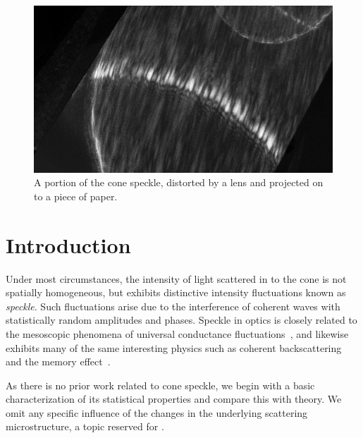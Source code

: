\begin{figure}[ht]
\centering
\includegraphics[keepaspectratio,width=15cm]{speckle/figures/Ag_LaSFN9_cone_lens11_cam-8899.jpg}
\caption{A portion of the cone speckle, distorted by a lens and projected on to a piece of paper.}
\label{fig:examplespeckle}
\end{figure}
\section{Introduction}
Under most circumstances, the intensity of light scattered in to the cone
is not spatially homogeneous, but exhibits distinctive intensity
fluctuations known as \textit{speckle}.  Such fluctuations arise due to the
interference of coherent waves with statistically random amplitudes and
phases.  Speckle in optics is closely related to the mesoscopic phenomena
of universal conductance fluctuations~\cite{lee1985universal}, and likewise
exhibits many of the same interesting physics such as coherent
backscattering~\cite{akkermans1986coherent} and the memory
effect~\cite{freund1988memory}.

As there is no prior work related to cone speckle, we begin with a basic
characterization of its statistical properties and compare this with
theory.  We omit any specific influence of the changes in the underlying
scattering microstructure, a topic reserved for
.  
